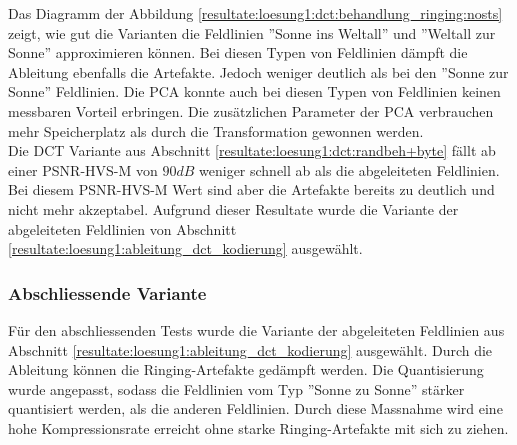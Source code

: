 Das Diagramm der Abbildung  \ref{resultate:loesung1:dct:behandlung_ringing:nosts} zeigt, wie gut die Varianten die Feldlinien ''Sonne ins Weltall'' und ''Weltall zur Sonne'' approximieren können. Bei diesen Typen von Feldlinien dämpft die Ableitung ebenfalls die Artefakte. Jedoch weniger deutlich als bei den ''Sonne zur Sonne'' Feldlinien. Die PCA konnte auch bei diesen Typen von Feldlinien keinen messbaren Vorteil erbringen. Die zusätzlichen Parameter der PCA verbrauchen mehr Speicherplatz als durch die Transformation gewonnen werden.\\
Die DCT Variante aus Abschnitt \ref{resultate:loesung1:dct:randbeh+byte} fällt ab einer PSNR-HVS-M von $90 dB$ weniger schnell ab als die abgeleiteten Feldlinien. Bei diesem PSNR-HVS-M Wert sind aber die Artefakte bereits zu deutlich und nicht mehr akzeptabel. Aufgrund dieser Resultate wurde die Variante der abgeleiteten Feldlinien von Abschnitt \ref{resultate:loesung1:ableitung_dct_kodierung} ausgewählt. 

\subsubsection{Abschliessende Variante}
Für den abschliessenden Tests wurde die Variante der abgeleiteten Feldlinien aus Abschnitt \ref{resultate:loesung1:ableitung_dct_kodierung} ausgewählt. Durch die Ableitung können die Ringing-Artefakte gedämpft werden. Die Quantisierung wurde angepasst, sodass die Feldlinien vom Typ ''Sonne zu Sonne'' stärker quantisiert werden, als die anderen Feldlinien. Durch diese Massnahme wird eine hohe Kompressionsrate erreicht ohne starke Ringing-Artefakte mit sich zu ziehen.


